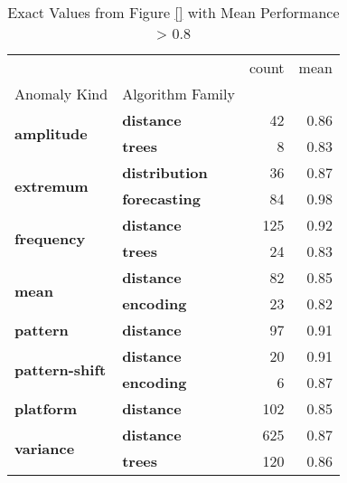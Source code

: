 \begin{table}
\caption{Exact Values from Figure \ref{} with Mean Performance > 0.8}
\label{tab:best-performer}
\begin{tabular}{llrr}
\toprule
 &  & count & mean \\
Anomaly Kind & Algorithm Family &  &  \\
\midrule
\multirow[t]{2}{*}{\textbf{amplitude}} & \textbf{distance} & 42 & 0.86 \\
\textbf{} & \textbf{trees} & 8 & 0.83 \\
\cline{1-4}
\multirow[t]{2}{*}{\textbf{extremum}} & \textbf{distribution} & 36 & 0.87 \\
\textbf{} & \textbf{forecasting} & 84 & 0.98 \\
\cline{1-4}
\multirow[t]{2}{*}{\textbf{frequency}} & \textbf{distance} & 125 & 0.92 \\
\textbf{} & \textbf{trees} & 24 & 0.83 \\
\cline{1-4}
\multirow[t]{2}{*}{\textbf{mean}} & \textbf{distance} & 82 & 0.85 \\
\textbf{} & \textbf{encoding} & 23 & 0.82 \\
\cline{1-4}
\textbf{pattern} & \textbf{distance} & 97 & 0.91 \\
\cline{1-4}
\multirow[t]{2}{*}{\textbf{pattern-shift}} & \textbf{distance} & 20 & 0.91 \\
\textbf{} & \textbf{encoding} & 6 & 0.87 \\
\cline{1-4}
\textbf{platform} & \textbf{distance} & 102 & 0.85 \\
\cline{1-4}
\multirow[t]{2}{*}{\textbf{variance}} & \textbf{distance} & 625 & 0.87 \\
\textbf{} & \textbf{trees} & 120 & 0.86 \\
\cline{1-4}
\bottomrule
\end{tabular}
\end{table}
